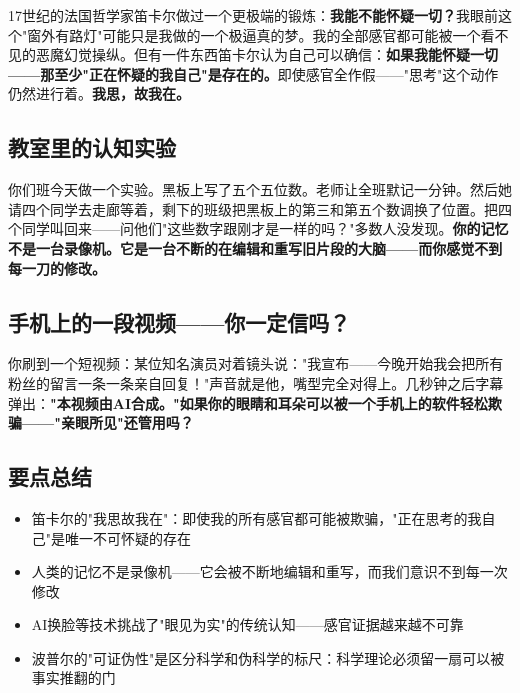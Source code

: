 \documentclass[a4paper,12pt]{ctexart}
\begin{document}
17世纪的法国哲学家笛卡尔做过一个更极端的锻炼：\textbf{我能不能怀疑一切？}我眼前这个"窗外有路灯"可能只是我做的一个极逼真的梦。我的全部感官都可能被一个看不见的恶魔幻觉操纵。但有一件东西笛卡尔认为自己可以确信：\textbf{如果我能怀疑一切——那至少"正在怀疑的我自己"是存在的。}即使感官全作假——"思考"这个动作仍然进行着。\textbf{我思，故我在。}

\subsection*{教室里的认知实验}

你们班今天做一个实验。黑板上写了五个五位数。老师让全班默记一分钟。然后她请四个同学去走廊等着，剩下的班级把黑板上的第三和第五个数调换了位置。把四个同学叫回来——问他们"这些数字跟刚才是一样的吗？"多数人没发现。\textbf{你的记忆不是一台录像机。它是一台不断的在编辑和重写旧片段的大脑——而你感觉不到每一刀的修改。}

\subsection*{手机上的一段视频——你一定信吗？}

你刷到一个短视频：某位知名演员对着镜头说："我宣布——今晚开始我会把所有粉丝的留言一条一条亲自回复！"声音就是他，嘴型完全对得上。几秒钟之后字幕弹出：\textbf{"本视频由AI合成。"}\textbf{如果你的眼睛和耳朵可以被一个手机上的软件轻松欺骗——"亲眼所见"还管用吗？}


\subsection*{要点总结}
\begin{itemize}
  \item 笛卡尔的"我思故我在"：即使我的所有感官都可能被欺骗，"正在思考的我自己"是唯一不可怀疑的存在
  \item 人类的记忆不是录像机——它会被不断地编辑和重写，而我们意识不到每一次修改
  \item AI换脸等技术挑战了"眼见为实"的传统认知——感官证据越来越不可靠
  \item 波普尔的"可证伪性"是区分科学和伪科学的标尺：科学理论必须留一扇可以被事实推翻的门
\end{itemize}
\end{document}
